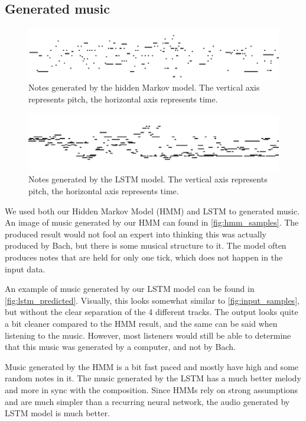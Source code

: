 \documentclass[11pt, twocolumn]{article}
\begin{document}
\subsection{Generated music}
\begin{figure}
    \centering
    \includegraphics[width=\linewidth]{images/hmm_samples.png}
    \caption{Notes generated by the hidden Markov model. The vertical axis represents pitch, the horizontal axis represents time.}
    \label{fig:hmm_samples}
\end{figure}

\begin{figure}
    \includegraphics[width=\linewidth]{images/lstm_samples.png}
    \caption{Notes generated by the LSTM model. The vertical axis represents pitch, the horizontal axis represents time.}
    \label{fig:lstm_predicted}
\end{figure}

We used both our Hidden Markov Model (HMM) and LSTM to generated music. An image of music generated by our HMM can found in \autoref{fig:hmm_samples}. The produced result would not fool an expert into thinking this was actually produced by Bach, but there is some musical structure to it. The model often produces notes that are held for only one tick, which does not happen in the input data. 

An example of music generated by our LSTM model can be found in \autoref{fig:lstm_predicted}. Visually, this looks somewhat similar to \autoref{fig:input_samples}, but without the clear separation of the 4 different tracks. The output looks quite a bit cleaner compared to the HMM result, and the same can be said when listening to the music. However, most listeners would still be able to determine that this music was generated by a computer, and not by Bach.


Music generated by the HMM is a bit fast paced and mostly have high and some random notes in it. The music generated by the LSTM has a much better melody and more in sync with the composition. Since HMMs rely on strong assumptions and are much simpler than a recurring neural network, the audio generated by LSTM model is much better.
\end{document}
